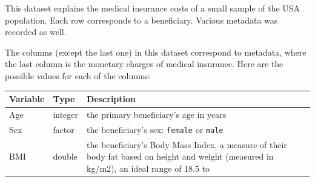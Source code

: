 \documentclass[
]{article}
\begin{document}
This dataset explains the medical insurance costs of a small sample of
the USA population. Each row corresponds to a beneficiary. Various
metadata was recorded as well.

The columns (except the last one) in this dataset correspond to
metadata, where the last column is the monetary charges of medical
insurance. Here are the possible values for each of the columns:

\begin{longtable}[]{@{}lll@{}}
\toprule
\begin{minipage}[b]{0.27\columnwidth}\raggedright
Variable\strut
\end{minipage} & \begin{minipage}[b]{0.18\columnwidth}\raggedright
Type\strut
\end{minipage} & \begin{minipage}[b]{0.46\columnwidth}\raggedright
Description\strut
\end{minipage}\tabularnewline
\midrule
\endhead
\begin{minipage}[t]{0.27\columnwidth}\raggedright
Age\strut
\end{minipage} & \begin{minipage}[t]{0.18\columnwidth}\raggedright
integer\strut
\end{minipage} & \begin{minipage}[t]{0.46\columnwidth}\raggedright
the primary beneficiary's age in years\strut
\end{minipage}\tabularnewline
\begin{minipage}[t]{0.27\columnwidth}\raggedright
Sex\strut
\end{minipage} & \begin{minipage}[t]{0.18\columnwidth}\raggedright
factor\strut
\end{minipage} & \begin{minipage}[t]{0.46\columnwidth}\raggedright
the beneficiary's sex: \texttt{female} or \texttt{male}\strut
\end{minipage}\tabularnewline
\begin{minipage}[t]{0.27\columnwidth}\raggedright
BMI\strut
\end{minipage} & \begin{minipage}[t]{0.18\columnwidth}\raggedright
double\strut
\end{minipage} & \begin{minipage}[t]{0.46\columnwidth}\raggedright
the beneficiary's Body Mass Index, a measure of their body fat based on
height and weight (measured in kg/m2), an ideal range of 18.5 to

\end{minipage}
\end{longtable}
\end{document}
